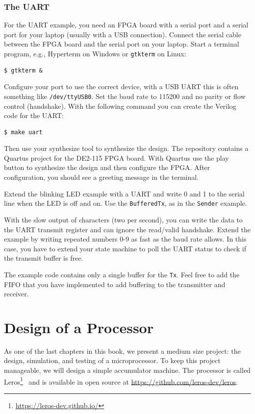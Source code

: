 \documentclass[%
    10pt,
    headinclude, footexclude,
    openright, %
    notitlepage,
    cleardoubleempty,
    headsepline,
    pointlessnumbers,
    bibtotoc, idxtotoc,
    ]{scrbook}
\newcommand{\code}[1]{{\small{\texttt{#1}}}}
\newcommand{\myref}[2]{\href{#1}{#2}}
\renewcommand{\myref}[2]{{#2}{\footnote{\url{#1}}}}
\begin{document}
\subsection{The UART}

For the UART example, you need an FPGA board with a serial port and
a serial port for your laptop (usually with a USB connection).
Connect the serial cable between the FPGA board and the serial port on
your laptop. Start a terminal program, e.g., Hyperterm on Windows
or \code{gtkterm} on Linux:
\begin{verbatim}
$ gtkterm &
\end{verbatim}
Configure your port to use the correct device, with a USB UART this
is often something like \code{/dev/ttyUSB0}. Set the baud rate to 115200
and no parity or flow control (handshake).
With the following command you can create the Verilog code for the UART:
\begin{verbatim}
$ make uart
\end{verbatim}
Then use your synthesize tool to synthesize the design.
The repository contains a Quartus project for the DE2-115 FPGA board.
With Quartus use the play button to synthesize the design and then configure
the FPGA.
After configuration, you should see a greeting message in the terminal.

Extend the blinking LED example with a UART and write 0 and 1 to the serial
line when the LED is off and on. Use the \code{BufferedTx}, as in the \code{Sender}
example.

With the slow output of characters (two per second), you can write the data
to the UART transmit register and can ignore the read/valid handshake.
Extend the example by writing repeated numbers 0-9 as fast as the baud rate allows.
In this case, you have to extend your state machine to poll the UART status
to check if the transmit buffer is free.

The example code contains only a single buffer for the \code{Tx}. Feel free to
add the FIFO that you have implemented to add buffering to the transmitter
and receiver. 

\chapter{Design of a Processor}

As one of the last chapters in this book, we present a medium size project:
the design, simulation, and testing of a microprocessor.
To keep this project manageable, we will design a simple accumulator
machine.
The processor is called \myref{https://leros-dev.github.io/}{Leros}~\cite{leros:arcs2019}
and is available in open source at \url{https://github.com/leros-dev/leros}.
\end{document}
